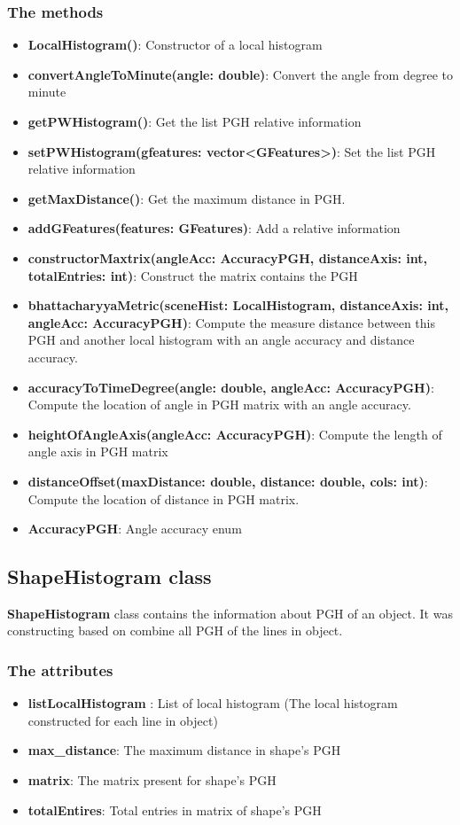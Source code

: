\subsubsection{The methods}
\begin{itemize}
\item\textbf{LocalHistogram()}: Constructor of a local histogram
\item\textbf{convertAngleToMinute(angle: double)}: Convert the angle from degree to minute
\item\textbf{getPWHistogram()}: Get the list PGH relative information
\item\textbf{setPWHistogram(gfeatures: vector\textless GFeatures\textgreater)}: Set the list PGH relative information
\item\textbf{getMaxDistance()}: Get the maximum distance in PGH.
\item\textbf{addGFeatures(features: GFeatures)}: Add a relative information
\item\textbf{constructorMaxtrix(angleAcc: AccuracyPGH, distanceAxis: int, totalEntries: int)}: Construct the matrix contains the PGH
\item\textbf{bhattacharyyaMetric(sceneHist: LocalHistogram, distanceAxis: int, angleAcc: AccuracyPGH)}: Compute the measure distance between this PGH and another local histogram with an angle accuracy and distance accuracy.
\item\textbf{accuracyToTimeDegree(angle: double, angleAcc: AccuracyPGH)}: Compute the location of angle in PGH matrix with an angle accuracy.
\item\textbf{heightOfAngleAxis(angleAcc: AccuracyPGH)}: Compute the length of angle axis in PGH matrix
\item\textbf{distanceOffset(maxDistance: double, distance: double, cols: int)}: Compute the location of distance in PGH matrix.
\item\textbf{AccuracyPGH}: Angle accuracy enum
\end{itemize}
\subsection{ShapeHistogram class}
\textbf{ShapeHistogram} class contains the information about PGH of an object. It was constructing based on combine all PGH of the lines in object.
\subsubsection{The attributes}
\begin{itemize}
\item\textbf{listLocalHistogram} : List of local histogram (The local histogram constructed for each line in object)
\item\textbf{max\_distance}: The maximum distance in shape's PGH
\item\textbf{matrix}: The matrix present for shape's PGH
\item\textbf{totalEntires}: Total entries in matrix of shape's PGH
\end{itemize}
